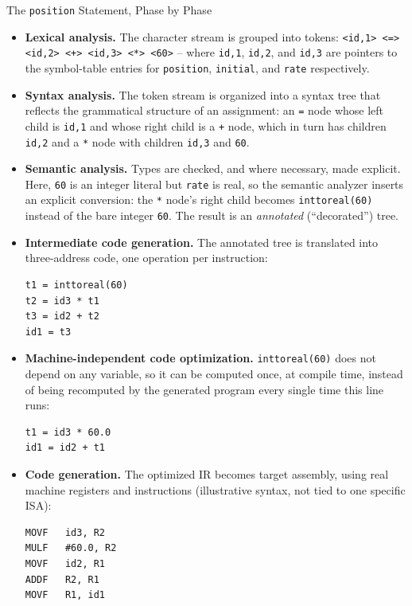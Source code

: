 \documentclass[full-course-notes.tex]{subfiles}
\begin{document}
\begin{examplebox}{The \texttt{position} Statement, Phase by Phase}
\begin{itemize}
  \item \textbf{Lexical analysis.} The character stream is grouped into tokens:
  \texttt{<id,1> <=> <id,2> <+> <id,3> <*> <60>} -- where \texttt{id,1}, \texttt{id,2}, and
  \texttt{id,3} are pointers to the symbol-table entries for \texttt{position}, \texttt{initial},
  and \texttt{rate} respectively.
  \item \textbf{Syntax analysis.} The token stream is organized into a syntax
  tree that reflects the grammatical structure of an assignment: an \texttt{=} node whose left
  child is \texttt{id,1} and whose right child is a \texttt{+} node, which in turn has children
  \texttt{id,2} and a \texttt{*} node with children \texttt{id,3} and \texttt{60}.
  \item \textbf{Semantic analysis.} Types are checked, and where necessary,
  made explicit. Here, \texttt{60} is an integer literal but \texttt{rate} is real, so the
  semantic analyzer inserts an explicit conversion: the \texttt{*} node's right child becomes
  \texttt{inttoreal(60)} instead of the bare integer \texttt{60}. The result is an
  \emph{annotated} (``decorated'') tree.
  \item \textbf{Intermediate code generation.} The annotated tree is
  translated into three-address code, one operation per instruction:
\begin{verbatim}
t1 = inttoreal(60)
t2 = id3 * t1
t3 = id2 + t2
id1 = t3
\end{verbatim}
  \item \textbf{Machine-independent code optimization.} \texttt{inttoreal(60)} does not depend on
  any variable, so it can be computed once, at compile time, instead of being recomputed by the
  generated program every single time this line runs:
\begin{verbatim}
t1 = id3 * 60.0
id1 = id2 + t1
\end{verbatim}
  \item \textbf{Code generation.} The optimized IR becomes target assembly, using
  real machine registers and instructions (illustrative syntax, not tied to one specific ISA):
\begin{verbatim}
MOVF   id3, R2
MULF   #60.0, R2
MOVF   id2, R1
ADDF   R2, R1
MOVF   R1, id1
\end{verbatim}
\end{itemize}
\end{examplebox}
\end{document}
